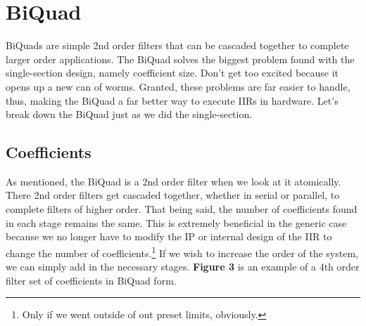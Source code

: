 \documentclass[12pt,a4paper,titlepage]{article}
\begin{document}
\newpage

\section{BiQuad}
BiQuads are simple 2nd order filters that can be cascaded together to complete
larger order applications. The BiQuad solves the biggest problem found with the
single-section design, namely coefficient size. Don't get too excited because it
opens up a new can of worms. Granted, these problems are far easier to handle,
thus, making the BiQuad a far better way to execute IIRs in hardware. Let's
break down the BiQuad just as we did the single-section.

\subsection{Coefficients}
As mentioned, the BiQuad is a 2nd order filter when we look at it
atomically. There 2nd order filters get cascaded together, whether in serial or
parallel, to complete filters of higher order. That being said, the number of
coefficients found in each stage remains the same. This is extremely beneficial
in the generic case because we no longer have to modify the IP or internal
design of the IIR to change the number of coefficients.\footnote{Only if we
  went outside of out preset limits, obviously.} If we wish to increase the
order of the system, we can simply add in the necessary stages. \textbf{Figure
  3} is an example of a 4th order filter set of coefficients in BiQuad form.
\end{document}
